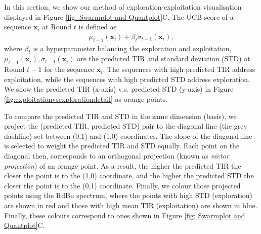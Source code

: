 In this section, we show our method of exploration-exploitation visualisation displayed in Figure \ref{fig: Swarmplot and Quantplot}C.
The UCB score of a sequence $\mathbf{x}_i$ at Round $t$ is defined as 
\begin{align*}
    \mu_{t-1}(\mathbf{x}_i) + \beta_t \sigma_{t-1}(\mathbf{x}_i),
\end{align*}
where $\beta_t$ is a hyperparameter balancing the exploration and exploitation, 
$\mu_{t-1}(\mathbf{x}_i), \sigma_{t-1}(\mathbf{x}_i)$ are the predicted TIR and standard deviation (STD) at Round $t-1$ for the sequence $\mathbf{x}_i$.
The sequences with high predicted TIR address exploitation, while the sequences with high predicted STD address exploration. 
We show the predicted TIR (x-axis) v.s. predicted STD (y-axis) in Figure \ref{fig:exploitationvsexplorationdetail} as orange points. 

To compare the predicted TIR and STD in the same dimension (basis), we project the (predicted TIR, predicted STD) pair to the diagonal line (the grey dashline) set between (0,1) and (1,0) coordinates.
The slope of the diagonal line is selected to weight the predicted TIR and STD equally. 
Each point on the diagonal then, corresponds to an orthogonal projection (known as \emph{vector projection}) of an orange point.
As a result, the higher the predicted TIR the closer the point is to the (1,0) coordinate, and the higher the predicted STD the closer the point is to the (0,1) coordinate.
Finally, we colour those projected points using the RdBu spectrum, where the points with high STD (exploration) are shown in red and those with high mean TIR (exploitation) are shown in blue.
Finally, these colours correspond to ones shown in Figure \mbox{\ref{fig: Swarmplot and Quantplot}C}.


